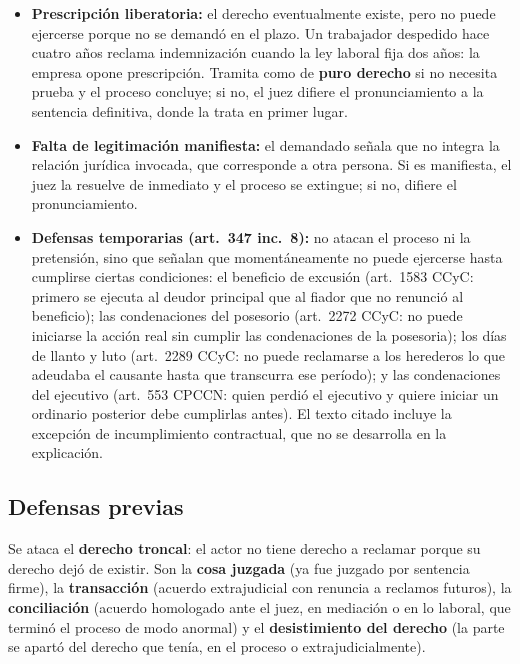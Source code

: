 \documentclass[12pt,oneside]{book}
\begin{document}
\begin{itemize}
\item \textbf{Prescripción liberatoria:} el derecho eventualmente existe, pero no puede ejercerse porque no se demandó en el plazo. Un trabajador despedido hace cuatro años reclama indemnización cuando la ley laboral fija dos años: la empresa opone prescripción. Tramita como de \textbf{puro derecho} si no necesita prueba y el proceso concluye; si no, el juez difiere el pronunciamiento a la sentencia definitiva, donde la trata en primer lugar.
\item \textbf{Falta de legitimación manifiesta:} el demandado señala que no integra la relación jurídica invocada, que corresponde a otra persona. Si es manifiesta, el juez la resuelve de inmediato y el proceso se extingue; si no, difiere el pronunciamiento. %
\item \textbf{Defensas temporarias (art.~347 inc.~8):} no atacan el proceso ni la pretensión, sino que señalan que momentáneamente no puede ejercerse hasta cumplirse ciertas condiciones: el beneficio de excusión (art.~1583 CCyC: primero se ejecuta al deudor principal que al fiador que no renunció al beneficio); las condenaciones del posesorio (art.~2272 CCyC: no puede iniciarse la acción real sin cumplir las condenaciones de la posesoria); los días de llanto y luto (art.~2289 CCyC: no puede reclamarse a los herederos lo que adeudaba el causante hasta que transcurra ese período); y las condenaciones del ejecutivo (art.~553 CPCCN: quien perdió el ejecutivo y quiere iniciar un ordinario posterior debe cumplirlas antes). El texto citado incluye la excepción de incumplimiento contractual, que no se desarrolla en la explicación. %
\end{itemize}

\subsection{Defensas previas}

Se ataca el \textbf{derecho troncal}: el actor no tiene derecho a reclamar porque su derecho dejó de existir. Son la \textbf{cosa juzgada} (ya fue juzgado por sentencia firme), la \textbf{transacción} (acuerdo extrajudicial con renuncia a reclamos futuros), la \textbf{conciliación} (acuerdo homologado ante el juez, en mediación o en lo laboral, que terminó el proceso de modo anormal) y el \textbf{desistimiento del derecho} (la parte se apartó del derecho que tenía, en el proceso o extrajudicialmente).
\end{document}
